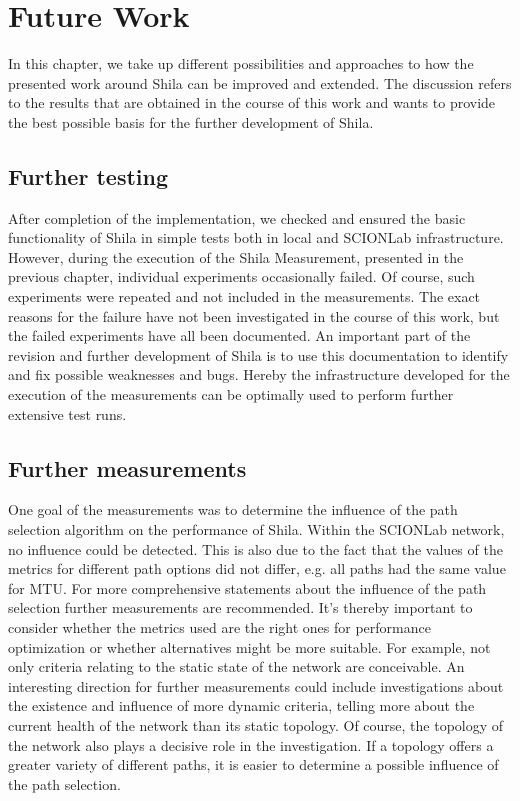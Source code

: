 \chapter{Future Work}
\label{chap:FutureWork}

In this chapter, we take up different possibilities and approaches to how the presented work around Shila can be improved and extended. The discussion refers to the results that are obtained in the course of this work and wants to provide the best possible basis for the further development of Shila.

\section*{Further testing}

After completion of the implementation, we checked and ensured the basic functionality of Shila in simple tests both in local and SCIONLab infrastructure. However, during the execution of the Shila Measurement, presented in the previous chapter, individual experiments occasionally failed. Of course, such experiments were repeated and not included in the measurements. The exact reasons for the failure have not been investigated in the course of this work, but the failed experiments have all been documented. An important part of the revision and further development of Shila is to use this documentation to identify and fix possible weaknesses and bugs. Hereby the infrastructure developed for the execution of the measurements can be optimally used to perform further extensive test runs.

\section*{Further measurements}

One goal of the measurements was to determine the influence of the path selection algorithm on the performance of Shila. Within the SCIONLab network, no influence could be detected. This is also due to the fact that the values of the metrics for different path options did not differ, e.g. all paths had the same value for MTU. For more comprehensive statements about the influence of the path selection further measurements are recommended. It's thereby important to consider whether the metrics used are the right ones for performance optimization or whether alternatives might be more suitable. For example, not only criteria relating to the static state of the network are conceivable. An interesting direction for further measurements could include investigations about the existence and influence of more dynamic criteria, telling more about the current health of the network than its static topology. Of course, the topology of the network also plays a decisive role in the investigation. If a topology offers a greater variety of different paths, it is easier to determine a possible influence of the path selection.

